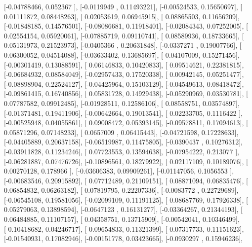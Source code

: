 \documentclass{article}
\begin{document}
       [-0.04788466,  0.052367  ],
       [-0.0119949 ,  0.11493221],
       [-0.00524533,  0.15650697],
       [ 0.01111872,  0.08448263],
       [ 0.02053619,  0.06945915],
       [ 0.08865503,  0.11656209],
       [-0.01848185,  0.14576501],
       [-0.08086681,  0.11918401],
       [-0.02084343,  0.07252005],
       [ 0.02554154,  0.05920061],
       [-0.07885719,  0.09110741],
       [ 0.08589936,  0.18733665],
       [ 0.05131973,  0.21523973],
       [-0.0405366 ,  0.20631848],
       [-0.0337271 ,  0.19007766],
       [ 0.06300052,  0.04514088],
       [-0.03633402,  0.13685697],
       [ 0.04107009,  0.15271456],
       [-0.00301419,  0.13088591],
       [ 0.06146833,  0.10420833],
       [ 0.09514621,  0.22381815],
       [-0.06684932,  0.08584049],
       [-0.02957433,  0.17520338],
       [ 0.00942145,  0.05251477],
       [-0.08898904,  0.22524127],
       [-0.04425964,  0.15103129],
       [-0.04549613,  0.08418472],
       [-0.09861415,  0.16740856],
       [ 0.05831728,  0.14929438],
       [-0.05290969,  0.03530781],
       [ 0.07787582,  0.09912485],
       [-0.01928511,  0.12586106],
       [ 0.08558751,  0.03574897],
       [-0.01371481,  0.19411906],
       [-0.00642664,  0.19013541],
       [ 0.02233705,  0.1116422 ],
       [-0.00525948,  0.04055861],
       [ 0.09008472,  0.05393145],
       [-0.09578811,  0.17094613],
       [ 0.05871296,  0.07148233],
       [ 0.0657009 ,  0.06415443],
       [-0.04721598,  0.17228633],
       [-0.04405889,  0.20637158],
       [-0.06519987,  0.11475805],
       [-0.0390437 ,  0.10276312],
       [-0.03911828,  0.11234246],
       [ 0.07723553,  0.13594638],
       [-0.07954222,  0.213077  ],
       [-0.06281887,  0.07476726],
       [-0.10896561,  0.18279922],
       [ 0.02117109,  0.10189076],
       [ 0.00270128,  0.178966  ],
       [-0.03606383,  0.09909261],
       [-0.01147056,  0.1056553 ],
       [-0.00683546,  0.20915892],
       [ 0.07712489,  0.21109151],
       [ 0.08871094,  0.06835476],
       [ 0.06854832,  0.06263182],
       [ 0.07819795,  0.22207336],
       [-0.0083772 ,  0.22729689],
       [-0.06545108,  0.19581056],
       [-0.02099109,  0.11191125],
       [ 0.08687769,  0.17926338],
       [ 0.05279063,  0.13898594],
       [-0.0647123 ,  0.16131277],
       [-0.03364267,  0.21344193],
       [ 0.06484885,  0.11107157],
       [ 0.04358751,  0.13715909],
       [-0.00542041,  0.10346499],
       [-0.10418682,  0.04246717],
       [-0.09654833,  0.11321399],
       [ 0.07317733,  0.11151623],
       [-0.01540931,  0.17082946],
       [-0.00151778,  0.03423665],
       [-0.0930297 ,  0.15946236],
\end{document}
